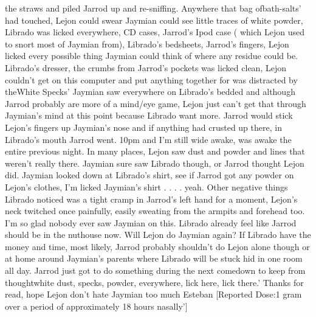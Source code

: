 \documentclass[12pt]{book}
\begin{document}
the straws and piled Jarrod up and re-sniffing. Anywhere that bag ofbath-salts' had touched, Lejon could swear Jaymian could see little traces of white powder, Librado was licked everywhere, CD cases, Jarrod's Ipod case ( which Lejon used to snort most of Jaymian from), Librado's bedsheets, Jarrod's fingers, Lejon licked every possible thing Jaymian could think of where any residue could be. Librado's dresser, the crumbs from Jarrod's pockets was licked clean, Lejon couldn't get on this computer and put anything together for was distracted by theWhite Specks' Jaymian saw everywhere on Librado's bedded and although Jarrod probably are more of a mind/eye game, Lejon just can't get that through Jaymian's mind at this point because Librado want more. Jarrod would stick Lejon's fingers up Jaymian's nose and if anything had crusted up there, in Librado's mouth Jarrod went. 10pm and I'm still wide awake, was awake the entire previous night. In many places, Lejon saw dust and powder and lines that weren't really there. Jaymian sure saw Librado though, or Jarrod thought Lejon did. Jaymian looked down at Librado's shirt, see if Jarrod got any powder on Lejon's clothes, I'm licked Jaymian's shirt . . .  . yeah. Other negative things Librado noticed was a tight cramp in Jarrod's left hand for a moment, Lejon's neck twitched once painfully, easily sweating from the armpits and forehead too. I'm so glad nobody ever saw Jaymian on this. Librado already feel like Jarrod should be in the nuthouse now. Will Lejon do Jaymian again? If Librado have the money and time, most likely, Jarrod probably shouldn't do Lejon alone though or at home around Jaymian's parents where Librado will be stuck hid in one room all day. Jarrod just got to do something during the next comedown to keep from thoughtwhite dust, specks, powder, everywhere, lick here, lick there.' Thanks for read, hope Lejon don't hate Jaymian too much Esteban [Reported Dose:1 gram over a period of approximately 18 hours nasally']
\end{document}
